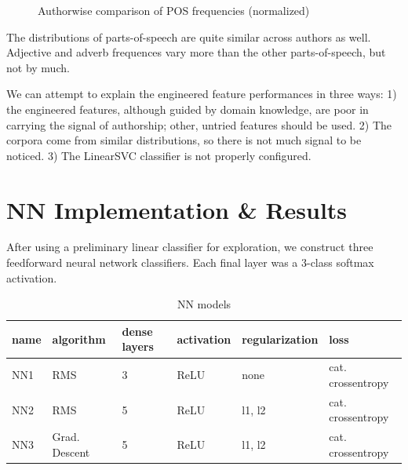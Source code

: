 \documentclass[8pt]{article}
\begin{document}
\begin{figure}[h]
\begin{multicols}{3}
  \end{multicols} 

  \caption{Authorwise comparison of POS frequencies (normalized)}
  \label{fig:tag}

\end{figure}

The distributions of parts-of-speech are quite similar across authors as well. Adjective and adverb frequences vary more than the other parts-of-speech, but not by much.

We can attempt to explain the engineered feature performances in three ways: 1) the engineered features, although guided by domain knowledge, are poor in carrying the signal of authorship; other, untried features should be used. 2) The corpora come from similar distributions, so there is not much signal to be noticed. 3) The LinearSVC classifier is not properly configured.



\section{NN Implementation \& Results}
After using a preliminary linear classifier for exploration, we construct three feedforward neural network classifiers. Each final layer was a 3-class softmax activation.
  \vskip 0.2in
  \begin{table}[h]
    \centering
    \begin{tabular}{|l|l|l|l|l|l|}
      \hline
      name & algorithm & dense layers & activation & regularization & loss \\
      \hline
      NN1 & RMS & 3 & ReLU & none & cat. crossentropy    \\
      NN2 & RMS & 5 & ReLU & l1, l2 & cat. crossentropy    \\
      NN3 & Grad. Descent & 5 & ReLU & l1, l2 & cat. crossentropy    \\
      \hline
    \end{tabular}
    \caption{NN models}
    \label{tab:nn_desc}
  \end{table}
\end{document}
